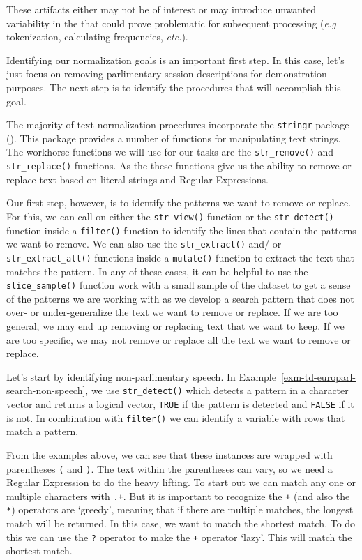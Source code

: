 \documentclass[
  letterpaper,
]{latex/krantz}
\theoremstyle{definition}
\theoremstyle{remark}
\begin{document}
These artifacts either may not be of interest or may introduce unwanted
variability in the that could prove problematic for subsequent
processing (\emph{e.g} tokenization, calculating frequencies,
\emph{etc.}).

Identifying our normalization goals is an important first step. In this
case, let's just focus on removing parlimentary session descriptions for
demonstration purposes. The next step is to identify the procedures that
will accomplish this goal.

The majority of text normalization procedures incorporate the
\texttt{stringr} package (). This
package provides a number of functions for manipulating text strings.
The workhorse functions we will use for our tasks are the
\texttt{str\_remove()} and \texttt{str\_replace()} functions. As the
these functions give us the ability to remove or replace text based on
literal strings and Regular Expressions.

Our first step, however, is to identify the patterns we want to remove
or replace. For this, we can call on either the \texttt{str\_view()}
function or the \texttt{str\_detect()} function inside a
\texttt{filter()} function to identify the lines that contain the
patterns we want to remove. We can also use the \texttt{str\_extract()}
and/ or \texttt{str\_extract\_all()} functions inside a
\texttt{mutate()} function to extract the text that matches the pattern.
In any of these cases, it can be helpful to use the
\texttt{slice\_sample()} function work with a small sample of the
dataset to get a sense of the patterns we are working with as we develop
a search pattern that does not over- or under-generalize the text we
want to remove or replace. If we are too general, we may end up removing
or replacing text that we want to keep. If we are too specific, we may
not remove or replace all the text we want to remove or replace.

Let's start by identifying non-parlimentary speech. In
Example~\ref{exm-td-europarl-search-non-speech}, we use
\texttt{str\_detect()} which detects a pattern in a character vector and
returns a logical vector, \texttt{TRUE} if the pattern is detected and
\texttt{FALSE} if it is not. In combination with \texttt{filter()} we
can identify a variable with rows that match a pattern.

From the examples above, we can see that these instances are wrapped
with parentheses \texttt{(} and \texttt{)}. The text within the
parentheses can vary, so we need a Regular Expression to do the heavy
lifting. To start out we can match any one or multiple characters with
\texttt{.+}. But it is important to recognize the \texttt{+} (and also
the \texttt{*}) operators are `greedy', meaning that if there are
multiple matches, the longest match will be returned. In this case, we
want to match the shortest match. To do this we can use the \texttt{?}
operator to make the \texttt{+} operator `lazy'. This will match the
shortest match.
\end{document}
